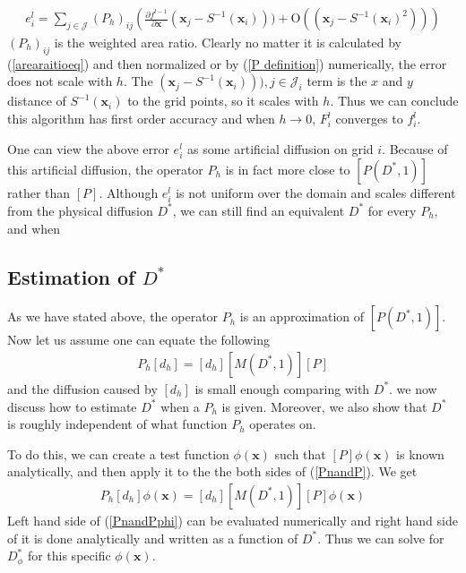 \documentclass{article}
\begin{document}
\begin{eqnarray}
e_i^l = \sum_{j \in \mathcal{J}} (P_h)_{ij} \left(
\frac{\partial{f^{l-1}}}{\partial{\mathbf{x}}}
(\mathbf{x}_j-S^{-1}(\mathbf{x}_i))) + \text{O}((\mathbf{x}_j-S^{-1}(\mathbf{x}_i)^2))\right)
\end{eqnarray}
$(P_h)_{ij}$ is the weighted area ratio. Clearly no matter it is
calculated by (\ref{arearaitioeq}) and then normalized or by (\ref{P
definition}) numerically, the error does not scale with $h$. The
$(\mathbf{x}_j-S^{-1}(\mathbf{x}_i))),{j \in \mathcal{J}_i}$ term is
the $x$ and $y$ distance of $S^{-1}(\mathbf{x}_i)$ to the grid
points, so it scales with $h$. Thus we can conclude this algorithm
has first order accuracy and when $h \rightarrow 0$, $F_i^l$
converges to $f_i^l$.


One can view the above error $e_i^l$ as some artificial diffusion on
grid $i$. Because of this artificial diffusion, the operator $P_h$
is in fact more close to $[P(D^*,1)]$ rather than $[P]$. Although
$e_i^l$ is not uniform over the domain and scales different from the
physical diffusion $D^*$, we can still find an equivalent $D^*$ for
every $P_h$, and when


\subsection{Estimation of $D^*$}
As we have stated above, the operator $P_h$ is an approximation of
$[P(D^*,1)]$. Now let us assume one can equate the following
\begin{eqnarray}
\label{PnandP}
 P_h[d_h] = [d_h][M(D^*,1)][P]
\end{eqnarray}
and the diffusion caused by $[d_h]$ is small enough comparing with
$D^*$. we now discuss how to estimate $D^*$ when a $P_h$ is given.
Moreover, we also show that $D^*$ is roughly independent of what
function $P_h$ operates on.


To do this, we can create a test function $\phi(\mathbf{x})$ such
that $[P]\phi(\mathbf{x})$ is known analytically, and then apply it
to the the both sides of (\ref{PnandP}). We get
\begin{eqnarray}
\label{PnandPphi}
 P_h[d_h]\phi(\mathbf{x}) = [d_h][M(D^*,1)][P]\phi(\mathbf{x})
\end{eqnarray}
Left hand side of (\ref{PnandPphi}) can be evaluated numerically and
right hand side of it is done analytically and written as a function
of $D^*$. Thus we can solve for $D^*_\phi$ for this specific
$\phi(\mathbf{x})$.
\end{document}

